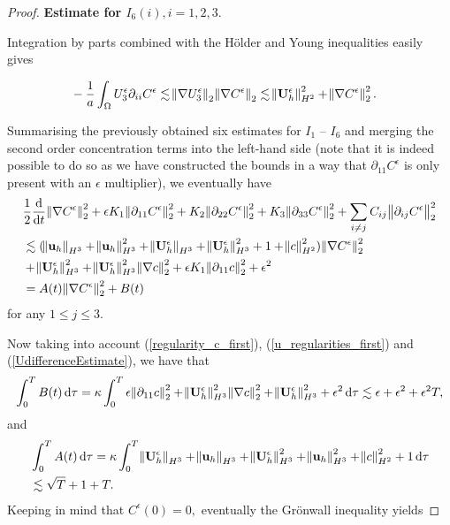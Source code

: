 \documentclass[11pt]{article}
\newcommand*\diff{\mathop{}\!\mathrm{d}}
\begin{document}
\begin{proof}
\bigskip

\textbf{Estimate for $I_6 (i), i = 1,2,3.$}

Integration by parts combined with the H\"older and Young inequalities easily gives

\begin{equation}
\begin{split}
& - \frac{1}{a} \int_\Omega U_3^\epsilon \partial_{ii} C^\epsilon \lesssim \norm{\nabla U_3^\epsilon}_2 \norm{\nabla C^\epsilon}_2 \lesssim \norm{\mathbf{U}_h^\epsilon}_{H^2}^2 + \norm{\nabla C^\epsilon}_2^2.
\end{split}
\end{equation}

\bigskip

Summarising the previously obtained six estimates for $I_1$ -- $I_6$ and merging the second order concentration terms into the left-hand side (note that it is indeed possible to do so as we have constructed the bounds in a way that $\partial_{11} C^\epsilon$ is only present with an $\epsilon$ multiplier), we eventually have
%
\begin{equation}
\begin{split}
& \frac{1}{2} \frac{\diff}{\diff t} \norm{\nabla C^\epsilon}_2^2 + \epsilon K_1 \norm{\partial_{11} C^\epsilon}_2^2 + K_2 \norm{\partial_{22} C^\epsilon}_2^2 + K_3 \norm{\partial_{33} C^\epsilon}_2^2 + \sum_{i \neq j} C_{ij} \norm{\partial_{ij} C^\epsilon}_2^2 \\
& \lesssim (\norm{\mathbf{u}_h}_{H^3} + \norm{\mathbf{u}_h}_{H^3}^2 + \norm{\mathbf{U}_h^\epsilon}_{H^3} + \norm{\mathbf{U}_h^\epsilon}_{H^3}^2 + 1 + \norm{c}_{H^2}^2) \norm{\nabla C^\epsilon}_2^2 \\
& + \norm{\mathbf{U}_h^\epsilon}_{H^3}^2 + \norm{\mathbf{U}_h^\epsilon}_{H^3}^2 \norm{\nabla c}_2^2 + \epsilon K_1 \norm{\partial_{11} c}_2^2 + \epsilon^2 \\
& = A(t) \norm{\nabla C^\epsilon}_2^2 + B(t) \raisetag{40pt}
\end{split}
\end{equation}
%
for any $1 \leq j \leq 3.$

Now taking into account (\ref{regularity_c_first}), (\ref{u_regularities_first}) and (\ref{UdifferenceEstimate}), we have that
%
\[ \int_0^T B(t) \diff \tau = \kappa \int_0^T \epsilon \norm{\partial_{11} c}_2^2 + \norm{\mathbf{U}_h^\epsilon}_{H^3}^2 \norm{\nabla c}_2^2 + \norm{\mathbf{U}_h^\epsilon}_{H^3}^2 + \epsilon^2 \diff \tau \lesssim \epsilon + \epsilon^2 + \epsilon^2 T,\]
%
and
%
\begin{equation}
\begin{split}
& \int_0^T A(t) \diff \tau = \kappa \int_0^T \norm{\mathbf{U}_h^\epsilon}_{H^3} + \norm{\mathbf{u}_h}_{H^3} + \norm{\mathbf{U}_h^\epsilon}_{H^3}^2 + \norm{\mathbf{u}_h}_{H^3}^2 + \norm{c}_{H^2}^2 + 1 \diff \tau \\
& \lesssim \sqrt{T} + 1 + T.
\end{split}
\end{equation}
%
Keeping in mind that $C^\epsilon(0) = 0,$ eventually the Gr\"onwall inequality yields


\end{proof}
\end{document}
